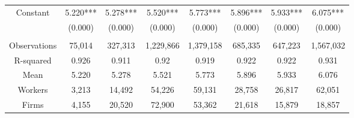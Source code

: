 \begin{tabular}{c|ccccccc}
Constant & 5.220*** & 5.278*** & 5.520*** & 5.773*** & 5.896*** & 5.933*** & 6.075*** \\
      & (0.000) & (0.000) & (0.000) & (0.000) & (0.000) & (0.000) & (0.000) \\
      &       &       &       &       &       &       &  \\
\midrule
Observations & 75,014 & 327,313 & 1,229,866 & 1,379,158 & 685,335 & 647,223 & 1,567,032 \\
R-squared & 0.926 & 0.911 & 0.92  & 0.919 & 0.922 & 0.922 & 0.931 \\
Mean  & 5.220 & 5.278 & 5.521 & 5.773 & 5.896 & 5.933 & 6.076 \\
Workers & 3,213 & 14,492 & 54,226 & 59,131 & 28,758 & 26,817 & 62,051 \\
Firms & 4,155 & 20,520 & 72,900 & 53,362 & 21,618 & 15,879 & 18,857 \\
\bottomrule
\bottomrule
\end{tabular}%
